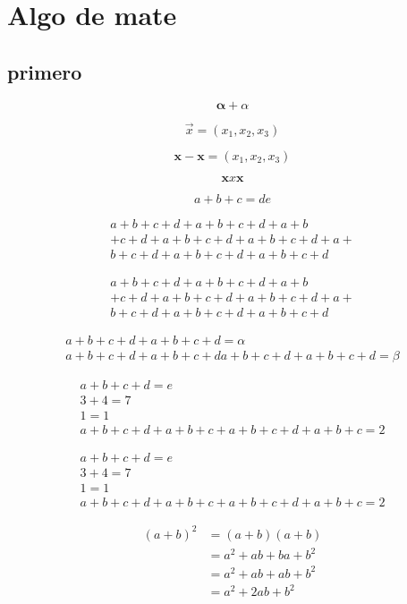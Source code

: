 \documentclass{report}
\numberwithin{equation}{section}
\theoremstyle{definition}
\theoremstyle{remark}
\begin{document}
	
	
\chapter{Algo de mate}
\section{primero}
	
$$
\boldsymbol{\alpha} +\alpha
$$

$$
\vec{x}=(x_1,x_2,x_3)
$$

$$
\boldsymbol{x}-\mathbf{x}=(x_1,x_2,x_3)
$$

$$
\pmb{x}x\boldsymbol{x}
$$

\begin{equation*}
a+b+c=de
\end{equation*}

\begin{multline}
a+b+c+d+a+b+c+d+a+b\\+c+d+a+b+c+d+a+b+c+d+a+\\
b+c+d+a+b+c+d+a+b+c+d
\end{multline}

\begin{multline*}
a+b+c+d+a+b+c+d+a+b\\+c+d+a+b+c+d+a+b+c+d+a+\\
b+c+d+a+b+c+d+a+b+c+d
\end{multline*}

\begin{equation}
\begin{split}
a+b+c+d+a+b+c+d=\alpha \\
a+b+c+d+a+b+c+da+b+c+d+a+b+c+d=\beta
\end{split}
\end{equation}

\begin{gather}
a+b+c+d=e \\
3+4=7 \\
1=1 \\
a+b+c+d+a+b+c+a+b+c+d+a+b+c=2
\end{gather}

\begin{gather*}
a+b+c+d=e \\
3+4=7 \\
1=1 \\
a+b+c+d+a+b+c+a+b+c+d+a+b+c=2
\end{gather*}

\begin{align}
(a+b)^2&=(a+b)(a+b) \\
 &=a^2+ab+ba+b^2 \\
 &=a^2+ab+ab+b^2 \\
 &=a^2+2ab+b^2
\end{align}
\end{document}
